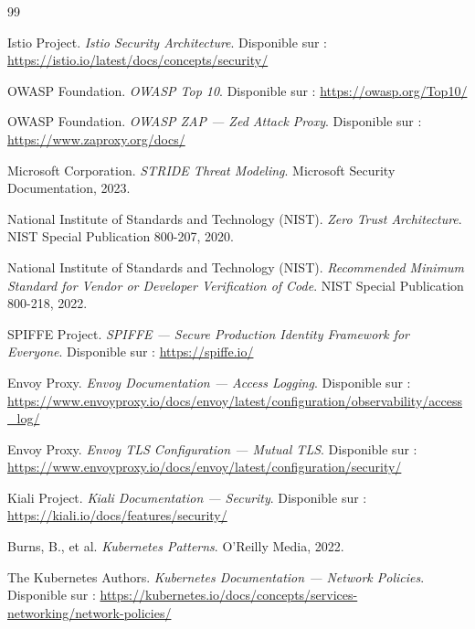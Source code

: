 \documentclass[12pt, a4paper, twoside]{report}
\begin{document}
\printbibliography[heading=bibintoc, title={Bibliographie}]
\begin{thebibliography}{99}

Istio Project.
\textit{Istio Security Architecture}.
Disponible sur : \url{https://istio.io/latest/docs/concepts/security/}

OWASP Foundation.
\textit{OWASP Top 10}.
Disponible sur : \url{https://owasp.org/Top10/}

OWASP Foundation.
\textit{OWASP ZAP --- Zed Attack Proxy}.
Disponible sur : \url{https://www.zaproxy.org/docs/}

Microsoft Corporation.
\textit{STRIDE Threat Modeling}.
Microsoft Security Documentation, 2023.

National Institute of Standards and Technology (NIST).
\textit{Zero Trust Architecture}.
NIST Special Publication 800-207, 2020.

National Institute of Standards and Technology (NIST).
\textit{Recommended Minimum Standard for Vendor or Developer Verification of Code}.
NIST Special Publication 800-218, 2022.

SPIFFE Project.
\textit{SPIFFE --- Secure Production Identity Framework for Everyone}.
Disponible sur : \url{https://spiffe.io/}

Envoy Proxy.
\textit{Envoy Documentation --- Access Logging}.
Disponible sur : \url{https://www.envoyproxy.io/docs/envoy/latest/configuration/observability/access_log/}

Envoy Proxy.
\textit{Envoy TLS Configuration --- Mutual TLS}.
Disponible sur : \url{https://www.envoyproxy.io/docs/envoy/latest/configuration/security/}

Kiali Project.
\textit{Kiali Documentation --- Security}.
Disponible sur : \url{https://kiali.io/docs/features/security/}

Burns, B., et al.
\textit{Kubernetes Patterns}.
O'Reilly Media, 2022.

The Kubernetes Authors.
\textit{Kubernetes Documentation --- Network Policies}.
Disponible sur : \url{https://kubernetes.io/docs/concepts/services-networking/network-policies/}


\end{thebibliography}
\end{document}
